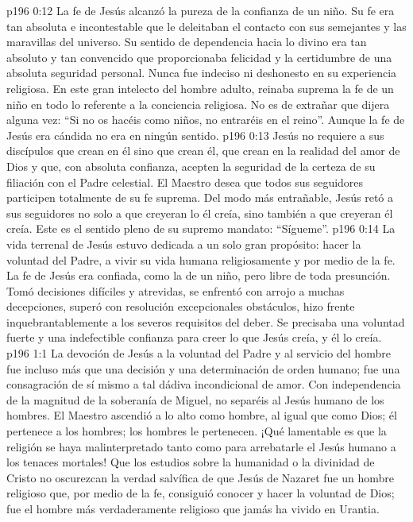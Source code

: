 \vs p196 0:12 La fe de Jesús alcanzó la pureza de la confianza de un niño. Su fe era tan absoluta e incontestable que le deleitaban el contacto con sus semejantes y las maravillas del universo. Su sentido de dependencia hacia lo divino era tan absoluto y tan convencido que proporcionaba felicidad y la certidumbre de una absoluta seguridad personal. Nunca fue indeciso ni deshonesto en su experiencia religiosa. En este gran intelecto del hombre adulto, reinaba suprema la fe de un niño en todo lo referente a la conciencia religiosa. No es de extrañar que dijera alguna vez: “Si no os hacéis como niños, no entraréis en el reino”. Aunque la fe de Jesús era cándida  no era  en ningún sentido.
\vs p196 0:13 Jesús no requiere a sus discípulos que crean en él sino que crean  él, que crean en la realidad del amor de Dios y que, con absoluta confianza, acepten la seguridad de la certeza de su filiación con el Padre celestial. El Maestro desea que todos sus seguidores participen totalmente de su fe suprema. Del modo más entrañable, Jesús retó a sus seguidores no solo a que creyeran lo  él creía, sino también a que creyeran  él creía. Este es el sentido pleno de su supremo mandato: “Sígueme”.
\vs p196 0:14 La vida terrenal de Jesús estuvo dedicada a un solo gran propósito: hacer la voluntad del Padre, a vivir su vida humana religiosamente y por medio de la fe. La fe de Jesús era confiada, como la de un niño, pero libre de toda presunción. Tomó decisiones difíciles y atrevidas, se enfrentó con arrojo a muchas decepciones, superó con resolución excepcionales obstáculos, hizo frente inquebrantablemente a los severos requisitos del deber. Se precisaba una voluntad fuerte y una indefectible confianza para creer lo que Jesús creía, y  él lo creía.
\vs p196 1:1 La devoción de Jesús a la voluntad del Padre y al servicio del hombre fue incluso más que una decisión y una determinación de orden humano; fue una consagración de sí mismo a tal dádiva incondicional de amor. Con independencia de la magnitud de la soberanía de Miguel, no separéis al Jesús humano de los hombres. El Maestro ascendió a lo alto como hombre, al igual que como Dios; él pertenece a los hombres; los hombres le pertenecen. ¡Qué lamentable es que la religión se haya malinterpretado tanto como para arrebatarle el Jesús humano a los tenaces mortales! Que los estudios sobre la humanidad o la divinidad de Cristo no oscurezcan la verdad salvífica de que Jesús de Nazaret fue un hombre religioso que, por medio de la fe, consiguió conocer y hacer la voluntad de Dios; fue el hombre más verdaderamente religioso que jamás ha vivido en Urantia.
